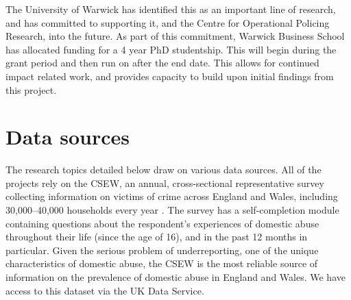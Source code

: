 \documentclass[11pt, a4paper]{article}
\begin{document}
The University of Warwick has identified this as an important line of research, and has committed to supporting it, and the Centre for Operational Policing Research, into the future. As part of this commitment, Warwick Business School has allocated funding for a 4 year PhD studentship. This will begin during the grant period and then run on after the end date. This allows for continued impact related work, and provides capacity to build upon initial findings from this project.





\section{Data sources}

The research topics detailed below draw on various data sources. All of the projects rely on the CSEW, an annual, cross-sectional representative survey collecting information on victims of crime across England and Wales, including 30,000--40,000 households every year \cite{OfficeforNationalStatistics2019}. The survey has a self-completion module containing questions about the respondent's experiences of domestic abuse throughout their life (since the age of 16), and in the past 12 months in particular. Given the serious problem of underreporting, one of the unique characteristics of domestic abuse, the CSEW is the most reliable source of information on the prevalence of domestic abuse in England and Wales. We have access to this dataset via the UK Data Service.
\end{document}
